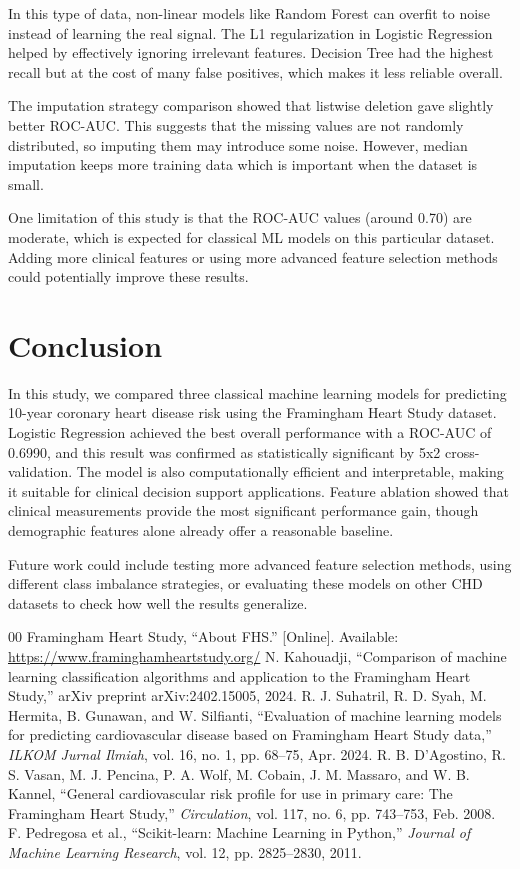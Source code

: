 \documentclass[conference]{IEEEtran}
\begin{document}
In this type of data, non-linear models like Random Forest can overfit to noise instead of learning the real signal. The L1 regularization in Logistic Regression helped by effectively ignoring irrelevant features. Decision Tree had the highest recall but at the cost of many false positives, which makes it less reliable overall.

The imputation strategy comparison showed that listwise deletion gave slightly better ROC-AUC. This suggests that the missing values are not randomly distributed, so imputing them may introduce some noise. However, median imputation keeps more training data which is important when the dataset is small.

One limitation of this study is that the ROC-AUC values (around 0.70) are moderate, which is expected for classical ML models on this particular dataset. Adding more clinical features or using more advanced feature selection methods could potentially improve these results.

\section{Conclusion}

In this study, we compared three classical machine learning models for predicting 10-year coronary heart disease risk using the Framingham Heart Study dataset. Logistic Regression achieved the best overall performance with a ROC-AUC of 0.6990, and this result was confirmed as statistically significant by 5x2 cross-validation. The model is also computationally efficient and interpretable, making it suitable for clinical decision support applications. Feature ablation showed that clinical measurements provide the most significant performance gain, though demographic features alone already offer a reasonable baseline.

Future work could include testing more advanced feature selection methods, using different class imbalance strategies, or evaluating these models on other CHD datasets to check how well the results generalize.

\begin{thebibliography}{00}
 Framingham Heart Study, ``About FHS.'' [Online]. Available: \url{https://www.framinghamheartstudy.org/}
 N. Kahouadji, ``Comparison of machine learning classification algorithms and application to the Framingham Heart Study,'' arXiv preprint arXiv:2402.15005, 2024.
 R. J. Suhatril, R. D. Syah, M. Hermita, B. Gunawan, and W. Silfianti, ``Evaluation of machine learning models for predicting cardiovascular disease based on Framingham Heart Study data,'' \textit{ILKOM Jurnal Ilmiah}, vol. 16, no. 1, pp. 68--75, Apr. 2024.
 R. B. D'Agostino, R. S. Vasan, M. J. Pencina, P. A. Wolf, M. Cobain, J. M. Massaro, and W. B. Kannel, ``General cardiovascular risk profile for use in primary care: The Framingham Heart Study,'' \textit{Circulation}, vol. 117, no. 6, pp. 743--753, Feb. 2008.
 F. Pedregosa et al., ``Scikit-learn: Machine Learning in Python,'' \textit{Journal of Machine Learning Research}, vol. 12, pp. 2825--2830, 2011.
\end{thebibliography}
\end{document}
